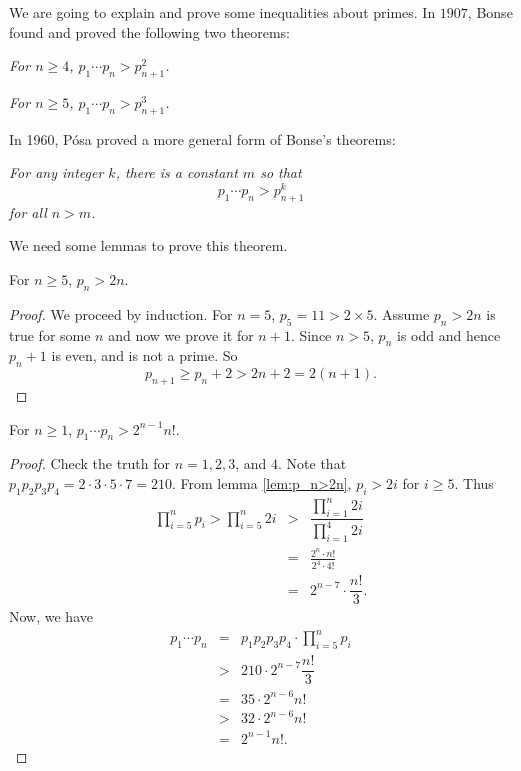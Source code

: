 \documentclass{subfiles}
\begin{document}
	We are going to explain and prove some inequalities about primes. In $1907$, Bonse found and proved the following two theorems:
	\begin{theorem}\sl
		For $n\geq 4$, $p_1\cdots p_n>p_{n+1}^2$.\label{thm:bonse1}
	\end{theorem}
	
	\begin{theorem}\sl
		For $n \geq 5$, $p_1\cdots p_n>p_{n+1}^3$.\label{thm:bonse2}
	\end{theorem}
	
	In 1960, P\'{o}sa proved a more general form of Bonse's theorems:
	
	\begin{theorem}\sl
		\label{thm:posa}
		For any integer $k$, there is a constant $m$ so that \[p_1\cdots p_n>p_{n+1}^k\]
		for all $n>m$.
	\end{theorem}
	
	We need some lemmas to prove this theorem.
	
	\begin{lemma}
		For $n\geq 5$, $p_n>2n$.\label{lem:p_n>2n}
	\end{lemma}
	
	\begin{proof}
		We proceed by induction. For $n=5$, $p_5=11>2 \times 5$. Assume $p_n >2n$ is true for some $n$ and now we prove it for $n+1$. Since $n>5$, $p_n$ is odd and hence $p_n+1$ is even, and is not a prime. So
		\[p_{n+1}\geq p_n+2>2n+2=2(n+1).\]
	\end{proof}
	
	\begin{lemma}
		For $n\geq1$, $p_1\cdots p_n> 2^{n-1}n!$.\label{lem:p_1p_2...p_n>2^{n-1}n!}
	\end{lemma}
	
	\begin{proof}
		Check the truth for $n=1,2,3$, and $4$. Note that $p_1p_2p_3p_4=2\cdot3\cdot5\cdot7=210$. From lemma \eqref{lem:p_n>2n}, $p_i>2i$ for $i\geq5$. Thus
			\begin{eqnarray*}
				\prod_{i=5}^np_i > \prod_{i=5}^n2i & > & \dfrac{\prod_{i=1}^n 2i}{\prod_{i=1}^4 2i}\\
												   & = & \frac{2^n \cdot n!}{2^4\cdot 4!}\\
												   & = & 2^{n-7}\cdot \dfrac{n!}{3}.
			\end{eqnarray*}
		Now, we have
			\begin{eqnarray*}
				p_1\cdots p_n & = & p_1p_2p_3p_4\cdot \prod_{i=5}^np_i \\
						   	  & > & 210\cdot2^{n-7}\dfrac{n!}{3}\\
							  & = & 35 \cdot2^{n-6}n!\\
							  & > & 32 \cdot 2^{n-6}n!\\
							  & = & 2^{n-1}n!.
			\end{eqnarray*}
	\end{proof}
	
\end{document}
